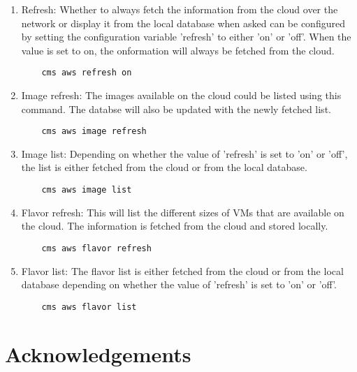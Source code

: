 \documentclass[9pt,twocolumn,twoside]{../../styles/osajnl}
\begin{document}
\begin{enumerate}
	
	\item Refresh: Whether to always fetch the information from the cloud over the network or display it from the local database when asked can be configured by setting the configuration variable 'refresh' to either 'on' or 'off'. When the value is set to on, the onformation will always be fetched from the cloud.
	
	\begin{verbatim}
    cms aws refresh on
	\end{verbatim}
	
	\item Image refresh: The images available on the cloud could be listed using this command. The databse will also be updated with the newly fetched list.
	
	\begin{verbatim}
    cms aws image refresh
	\end{verbatim}
	
	\item Image list: Depending on whether the value of 'refresh' is set to 'on' or 'off', the list is either fetched from the cloud or from the local database.
	
	\begin{verbatim}
    cms aws image list
	\end{verbatim}
	
	\item Flavor refresh: This will list the different sizes of VMs that are available on the cloud. The information is fetched from the cloud and stored locally.
	
	\begin{verbatim}
    cms aws flavor refresh
	\end{verbatim}
	
	\item Flavor list: The flavor list is either fetched from the cloud or from the local database depending on whether the value of 'refresh' is set to 'on' or 'off'.
	
	\begin{verbatim}
    cms aws flavor list
	\end{verbatim}
	
\end{enumerate}
\section*{Acknowledgements}
\end{document}
